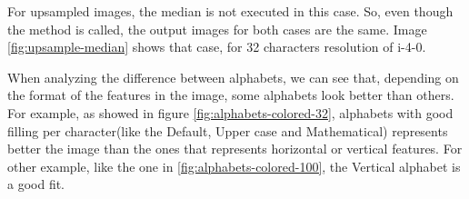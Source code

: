 \documentclass[]{IEEEtran}
\begin{document}
For upsampled images, the median is not executed in this case. So, even though the method is called, the output images for both cases are the same. Image \ref{fig:upsample-median} shows that case, for 32 characters resolution of i-4-0.


When analyzing the difference between alphabets, we can see that, depending on the format of the features in the image, some alphabets look better than others. For example, as showed in figure \ref{fig:alphabets-colored-32}, alphabets with good filling per character(like the Default, Upper case and Mathematical) represents better the image than the ones that represents horizontal or vertical features. For other example, like the one in \ref{fig:alphabets-colored-100}, the Vertical alphabet is a good fit. 


\end{document}
